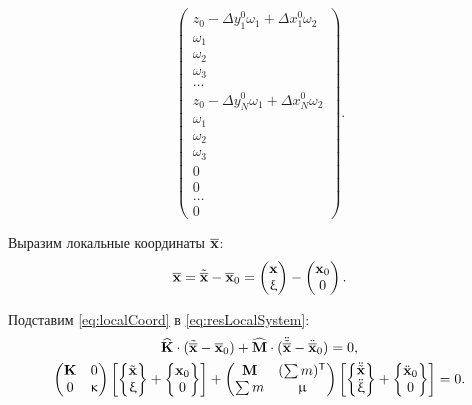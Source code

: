 \begin{equation*}
\begin{pmatrix}
		z_0 -\Delta y_1^0 \omega_1 + \Delta x_1^0 \omega_2 \\
		\omega_1 \\
		\omega_2	\\
		\omega_3 \\
		\hdots \\
		z_0 -\Delta y_N^0 \omega_1 + \Delta x_N^0 \omega_2 \\
		\omega_1 \\
		\omega_2 \\
		\omega_3 \\
		0 \\
		0 \\
		\hdots \\
		0
	 \end{pmatrix}.
\end{equation*}

Выразим локальные координаты $ \overline{\mathbf{x}} $:
\begin{equation}
	\overline{\mathbf{x}} = \tilde{\overline{\mathbf{x}}} - \overline{\mathbf{x}}_0 = \begin{pmatrix}	\mathbf{x} \\ \upxi \end{pmatrix} -
\begin{pmatrix} \mathbf{x}_0 \\ 0\end{pmatrix}.
	\label{eq:localCoord}
\end{equation}

Подставим \eqref{eq:localCoord} в \eqref{eq:resLocalSystem}:
\begin{gather}
	\widehat{\mathbf{K}} \cdot (\tilde{\overline{\mathbf{x}}} - \overline{\mathbf{x}}_0) + \widehat{\mathbf{M}} \cdot  (\ddot{\tilde{\overline{\mathbf{x}}}} - \ddot{\overline{\mathbf{x}}}_0) = 0, \\
	\begin{pmatrix}
		\mathbf{K} & 0 \\
		0 & \upkappa
	\end{pmatrix}
	\left[
	\begin{Bmatrix}
		\tilde{\mathbf{x}} \\
		\upxi
	\end{Bmatrix}
	+
	\begin{Bmatrix}
		\mathbf{x}_0 \\
		0
	\end{Bmatrix}
	\right]
	+
	\begin{pmatrix}
	\mathbf{M} & (\sum m) ^ \mathsf{T} \\
	\sum m & \upmu
	\end{pmatrix}
	\left[
	\begin{Bmatrix}
		\ddot{\tilde{\mathbf{x}}} \\
		\ddot{\upxi}
	\end{Bmatrix}
	+
	\begin{Bmatrix}
		\ddot{\mathbf{x}}_0 \\
		0
	\end{Bmatrix}
	\right] = 0 \nonumber.
\end{gather}

